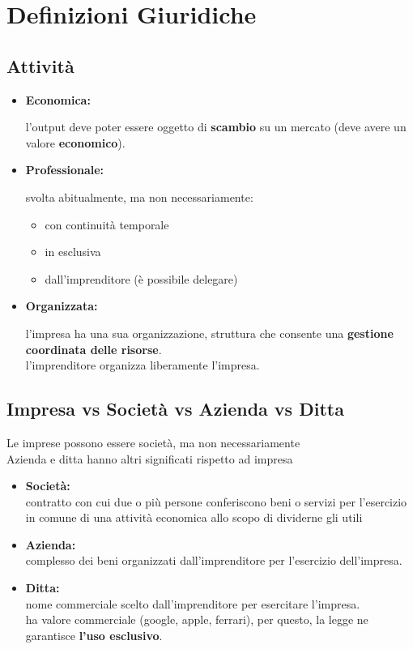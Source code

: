 \documentclass[../main.tex]{subfiles}
\begin{document}
\section{Definizioni Giuridiche}

\subsection{Attività}

\begin{itemize}
    \item \textbf{Economica:}

          l'output deve poter essere oggetto di \textbf{scambio} su un mercato (deve avere un valore \textbf{economico}).

    \item \textbf{Professionale:}

          svolta abitualmente, ma non necessariamente:
          \begin{itemize}
              \item con continuità temporale
              \item in esclusiva
              \item dall'imprenditore (è possibile delegare)
          \end{itemize}

    \item \textbf{Organizzata:}

          l'impresa ha una sua organizzazione, struttura che consente una \textbf{gestione coordinata delle risorse}.\\
          l'imprenditore organizza liberamente l'impresa.

\end{itemize}

\subsection{Impresa vs Società vs Azienda vs Ditta}

Le imprese possono essere società, ma non necessariamente\\
Azienda e ditta hanno altri significati rispetto ad impresa

\begin{itemize}
    \item \textbf{Società:}\\
          contratto con cui due o più persone conferiscono beni o servizi per l'esercizio in comune di una attività economica allo scopo di dividerne gli utili

    \item \textbf{Azienda:}\\
          complesso dei beni organizzati dall'imprenditore per l'esercizio dell'impresa.

    \item \textbf{Ditta:}\\
          nome commerciale scelto dall'imprenditore per esercitare l'impresa.\\
          ha valore commerciale (google, apple, ferrari), per questo, la legge ne garantisce \textbf{l'uso esclusivo}.

\end{itemize}
\end{document}
